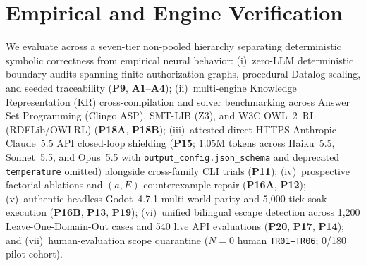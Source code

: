 \section{Empirical and Engine Verification}\label{sec:eval}
We evaluate \system{} across a seven-tier non-pooled hierarchy separating deterministic symbolic correctness from empirical neural behavior:
(i)~zero-LLM deterministic boundary audits spanning finite authorization graphs, procedural Datalog scaling, and seeded traceability (\textbf{P9}, \textbf{A1}--\textbf{A4});
(ii)~multi-engine Knowledge Representation (KR) cross-compilation and solver benchmarking across Answer Set Programming (Clingo ASP), SMT-LIB (Z3), and W3C OWL~2~RL (RDFLib/OWLRL) (\textbf{P18A}, \textbf{P18B});
(iii)~attested direct HTTPS Anthropic Claude~5.5 API closed-loop shielding (\textbf{P15}; $1.05\text{M}$ tokens across Haiku~5.5, Sonnet~5.5, and Opus~5.5 with \texttt{output\_config.json\_schema} and deprecated \texttt{temperature} omitted) alongside cross-family CLI trials (\textbf{P11});
(iv)~prospective factorial ablations and $(a,E)$ counterexample repair (\textbf{P16A}, \textbf{P12});
(v)~authentic headless Godot~4.7.1 multi-world parity and 5,000-tick soak execution (\textbf{P16B}, \textbf{P13}, \textbf{P19});
(vi)~unified bilingual escape detection across 1,200 Leave-One-Domain-Out cases and 540 live API evaluations (\textbf{P20}, \textbf{P17}, \textbf{P14}); and
(vii)~human-evaluation scope quarantine ($N{=}0$ human \texttt{TR01--TR06}; 0/180 pilot cohort).

